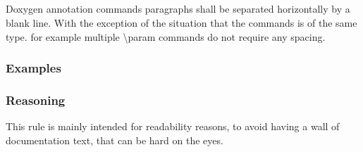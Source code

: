 \subsection*{\doxygenRule{}}

Doxygen annotation commands paragraphs shall be separated horizontally by a blank line. With the exception of the situation that the commands is of the same type. for example multiple \textbackslash param commands do not require any spacing.

\subsubsection*{Examples}

\noindent
\begin{minipage}[t]{\codelstwidth\textwidth}
    
\end{minipage}\hfill
\begin{minipage}[t]{\codelstwidth\textwidth}
    
\end{minipage}

\subsubsection*{Reasoning}

This rule is mainly intended for readability reasons, to avoid having a wall of documentation text, that can be hard on the eyes.
